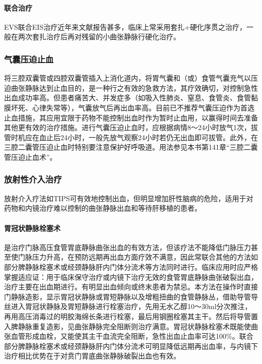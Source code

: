 \paragraph{联合治疗}

EVS联合EIS治疗近年来文献报告甚多，临床上常采用套扎+硬化序贯之治疗，一般在两次套扎治疗后再对残留的小曲张静脉行硬化治疗。

\subsubsection{气囊压迫止血}

将三腔双囊管或四腔双囊管插入上消化道内，将胃气囊和（或）食管气囊充气以压迫曲张静脉达到止血目的，是一种行之有效的急救方法，其疗效确切，对控制急性出血成功率高。但患者痛苦大、并发症多（如吸入性肺炎、窒息、食管炎、食管黏膜坏死、心律失常等），气囊放气后再出血率高。目前已不推荐气囊压迫作为首选止血措施，其应用宜限于药物不能控制出血时作为暂时止血用，以赢得时间去准备其他更有效的治疗措施。进行气囊压迫止血时，应根据病情8～24小时放气1次，拔管时机应在血止后24小时，一般先放气观察24小时若仍无出血即可拔管。此外，在三腔二囊管压迫止血时特别要注意保护好呼吸道。用法参见本书第141章“三腔二囊管压迫止血术”。

\subsubsection{放射性介入治疗}

放射介入疗法如TIPS可有效地控制出血，但明显增加肝性脑病的危险，适用于对药物和内镜治疗难以控制的曲张静脉出血和等待肝移植的患者。

\paragraph{胃冠状静脉栓塞术}

是治疗门脉高压食管胃底静脉曲张出血的有效方法，但该疗法不能降低门脉压力甚至使门脉压力升高，在预防远期再出血方面疗效不满意，因此常联合其他的方法如部分脾静脉栓塞术或经颈静脉肝内门体分流术等方法同时进行。临床应用时应严格掌握适应证：用于临床保守治疗或内镜下治疗无效的食管胃底静脉曲张破裂出血，治疗主要在出血期进行。有明显出血倾向或终末患者为禁忌。本方法在操作时直接门静脉造影，显示胃冠状静脉或胃短静脉以及增粗扭曲的食管静脉丛，借助导管导丝进入胃冠状静脉及胃短静脉进行栓塞治疗，先用无水乙醇10～30ml分次推注，再用高压消毒过的明胶海绵长条进行栓塞，最后用钢圈栓塞其主干。然后将导管置入脾静脉重复造影，见曲张静脉完全阻断则治疗满意。胃冠状静脉栓塞术既能使曲张血管形成血栓，又能使其主干血流完全阻断，急性出血止血率可达100\%。联合部分脾静脉栓塞术或经颈静脉肝内门体分流术可明显降低远期再出血率，与内镜下治疗相比优势在于对贲门胃底曲张静脉破裂出血也有效。

